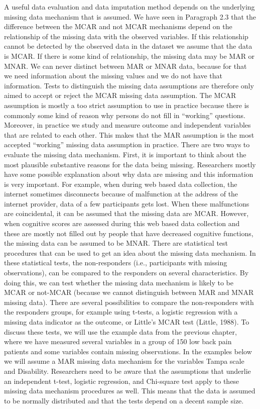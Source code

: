 \documentclass[]{book}
\begin{document}
A useful data evaluation and data imputation method depends on the
underlying missing data mechanism that is assumed. We have seen in
Paragraph 2.3 that the difference between the MCAR and not MCAR
mechanisms depend on the relationship of the missing data with the
observed variables. If this relationship cannot be detected by the
observed data in the dataset we assume that the data is MCAR. If there
is some kind of relationship, the missing data may be MAR or MNAR. We
can never distinct between MAR or MNAR data, because for that we need
information about the missing values and we do not have that
information. Tests to distinguish the missing data assumptions are
therefore only aimed to accept or reject the MCAR missing data
assumption. The MCAR assumption is mostly a too strict assumption to use
in practice because there is commonly some kind of reason why persons do
not fill in ``working'' questions. Moreover, in practice we study and
measure outcome and independent variables that are related to each
other. This makes that the MAR assumption is the most accepted
``working'' missing data assumption in practice. There are two ways to
evaluate the missing data mechanism. First, it is important to think
about the most plausible substantive reasons for the data being missing.
Researchers mostly have some possible explanation about why data are
missing and this information is very important. For example, when during
web based data collection, the internet sometimes disconnects because of
malfunction at the address of the internet provider, data of a few
participants gets lost. When these malfunctions are coincidental, it can
be assumed that the missing data are MCAR. However, when cognitive
scores are assessed during this web based data collection and these are
mostly not filled out by people that have decreased cognitive functions,
the missing data can be assumed to be MNAR. There are statistical test
procedures that can be used to get an idea about the missing data
mechanism. In these statistical tests, the non-responders (i.e.,
participants with missing observations), can be compared to the
responders on several characteristics. By doing this, we can test
whether the missing data mechanism is likely to be MCAR or not-MCAR
(because we cannot distinguish between MAR and MNAR missing data). There
are several possibilities to compare the non-responders with the
responders groups, for example using t-tests, a logistic regression with
a missing data indicator as the outcome, or Little's MCAR test (Little,
1988). To discuss these tests, we will use the example data from the
previous chapter, where we have measured several variables in a group of
150 low back pain patients and some variables contain missing
observations. In the examples below we will assume a MAR missing data
mechanism for the variables Tampa scale and Disability. Researchers need
to be aware that the assumptions that underlie an independent t-test,
logistic regression, and Chi-square test apply to these missing data
mechanism procedures as well. This means that the data is assumed to be
normally distributed and that the tests depend on a decent sample size.
\end{document}
